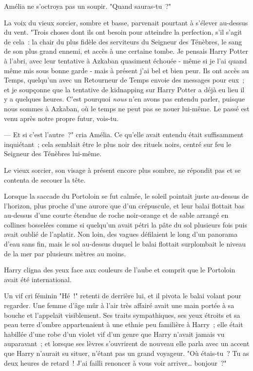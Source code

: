 Amélia ne s'octroya pas un soupir. "Quand sauras-tu~?"

La voix du vieux sorcier, sombre et basse, parvenait pourtant à s'élever au-dessus du vent. "Trois choses dont ils ont besoin pour atteindre la perfection, s'il s'agit de cela~: la chair du plus fidèle des serviteurs du Seigneur des Ténèbres, le sang de son plus grand ennemi, et accès à une certaine tombe. Je pensais Harry Potter à l'abri, avec leur tentative à Azkaban quasiment échouée - même si je l'ai quand même mis sous bonne garde - mais à présent j'ai bel et bien peur. Ils ont accès au Temps, quelqu'un avec un Retourneur de Temps envoie des messages pour eux~; et je soupçonne que la tentative de kidnapping sur Harry Potter a déjà eu lieu il y a quelques heures. C'est pourquoi \emph{nous} n'en avons pas entendu parler, puisque nous sommes à Azkaban, où le temps ne peut pas se nouer lui-même. Le passé est venu après notre propre futur, vois-tu.

--- Et si c'est l'autre~?" cria Amélia. Ce qu'elle avait entendu était suffisamment inquiétant~; cela semblait être le plus noir des rituels noirs, centré sur feu le Seigneur des Ténèbres lui-même.

Le vieux sorcier, son visage à présent encore plus sombre, ne répondit pas et se contenta de secouer la tête.

\later

Lorsque la saccade du Portoloin se fut calmée, le soleil pointait juste au-dessus de l'horizon, plus proche d'une aurore que d'un crépuscule, et leur balai flottait bas au-dessus d'une courte étendue de roche noir-orange et de sable arrangé en collines bosselées comme si quelqu'un avait pétri la pâte du sol plusieurs fois puis avait oublié de l'aplatir. Non loin, des vagues défilaient le long d'un panorama d'eau sans fin, mais le sol au-dessus duquel le balai flottait surplombait le niveau de la mer par plusieurs mètres au moins.

Harry cligna des yeux face aux couleurs de l'aube et comprit que le Portoloin avait été international.

Un vif cri féminin "Hé~!" retenti de derrière lui, et il pivota le balai volant pour regarder. Une femme d'âge mûr à l'air très affairé avait une main portée à sa bouche et l'appelait visiblement. Ses traits sympathiques, ses yeux étroits et sa peau terre d'ombre appartenaient à une ethnie peu familière à Harry~; elle était habillée d'une robe d'un violet vif d'un genre que Harry n'avait jamais vu auparavant~; et lorsque ses lèvres s'ouvrirent de nouveau elle parla avec un accent que Harry n'aurait su situer, n'étant pas un grand voyageur. "Où étais-tu~? Tu as deux heures de retard~! J'ai failli renoncer à vous voir arriver… bonjour~?"

